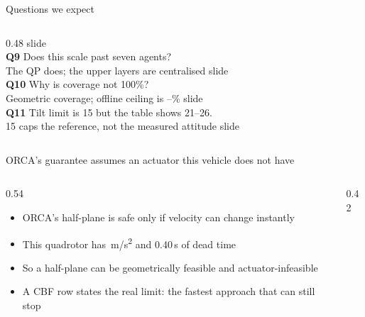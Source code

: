 \documentclass[aspectratio=169,11pt,t]{beamer}
\begin{document}
\begin{frame}{Questions we expect}
\begin{columns}[T,onlytextwidth]
\begin{column}{0.48\textwidth}
{        \textperiodcentered{} slide \pageref{q:cost}}\\[0.45ex]
      \textbf{Q9} Does this scale past seven agents?\\
      {\color{epicmuted}\scriptsize The QP does; the upper layers are centralised
        \textperiodcentered{} slide \pageref{q:scale}}\\[0.45ex]
      \textbf{Q10} Why is coverage not 100\%?\\
      {\color{epicmuted}\scriptsize Geometric coverage; offline ceiling is
        \CovofflineUshapeLqr--\CovofflinePlusHinf\%
        \textperiodcentered{} slide \pageref{q:cov}}\\[0.45ex]
      \textbf{Q11} Tilt limit is 15\textdegree{} but the table shows 21--26\textdegree.\\
      {\color{epicmuted}\scriptsize 15\textdegree{} caps the reference, not the
        measured attitude \textperiodcentered{} slide \pageref{q:tilt}}
    \end{column}
  \end{columns}
\end{frame}

\begin{frame}{ORCA's guarantee assumes an actuator this vehicle does not have}
  \label{q:orca}
  \begin{columns}[T,onlytextwidth]
    \begin{column}{0.54\textwidth}
      \begin{itemize}\bulletgap\small
        \item ORCA's half-plane is safe only if velocity can change instantly
        \item This quadrotor has \PlantAmax\,m/s\textsuperscript{2} and 0.40\,s
              of dead time
        \item So a half-plane can be geometrically feasible and actuator-infeasible
        \item A CBF row states the real limit: the fastest approach that can
              still stop
      \end{itemize}
    \end{column}
    \begin{column}{0.42\textwidth}\end{column}
  \end{columns}
\end{frame}
\end{document}
